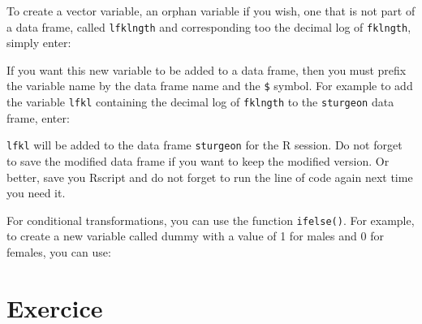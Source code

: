 \documentclass[
  12pt,
]{book}
\newenvironment{Shaded}{\begin{snugshade}}{\end{snugshade}}
\newcommand{\DecValTok}[1]{\textcolor[rgb]{0.00,0.00,0.81}{#1}}
\newcommand{\KeywordTok}[1]{\textcolor[rgb]{0.13,0.29,0.53}{\textbf{#1}}}
\newcommand{\NormalTok}[1]{#1}
\newcommand{\OperatorTok}[1]{\textcolor[rgb]{0.81,0.36,0.00}{\textbf{#1}}}
\newcommand{\StringTok}[1]{\textcolor[rgb]{0.31,0.60,0.02}{#1}}
\begin{document}
To create a vector variable, an orphan variable if you wish, one that is not part of a data frame, called \texttt{lfklngth} and corresponding too the decimal log of \texttt{fklngth}, simply enter:

\begin{Shaded}
\end{Shaded}

If you want this new variable to be added to a data frame, then you must prefix the variable name by the data frame name and the \texttt{\$} symbol.
For example to add the variable \texttt{lfkl} containing the decimal log of \texttt{fklngth} to the \texttt{sturgeon} data frame, enter:

\begin{Shaded}
\end{Shaded}

\texttt{lfkl} will be added to the data frame \texttt{sturgeon} for the R session.
Do not forget to save the modified data frame if you want to keep the modified version. Or better, save you Rscript and do not forget to run the line of code again next time you need it.

For conditional transformations, you can use the function \texttt{ifelse()}.
For example, to create a new variable called dummy with a value of 1 for males and 0 for females, you can use:

\begin{Shaded}
\end{Shaded}

\hypertarget{exercice}{%
\section{Exercice}\label{exercice}}
\end{document}
